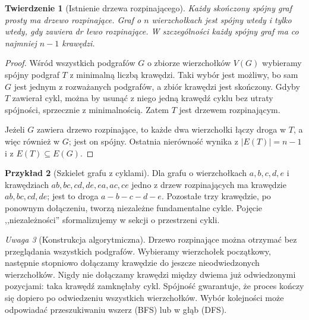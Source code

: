 \documentclass[11pt,a4paper]{report}
\numberwithin{equation}{section}
\theoremstyle{plain}
\newtheorem{twierdzenie}{Twierdzenie}[section]
\theoremstyle{definition}
\newtheorem{przyklad}[twierdzenie]{Przykład}
\theoremstyle{remark}
\newtheorem{uwaga}[twierdzenie]{Uwaga}
\begin{document}
\begin{twierdzenie}[Istnienie drzewa rozpinającego]
Każdy skończony spójny graf prosty ma drzewo
rozpinające. Graf o $n$ wierzchołkach jest
spójny wtedy i tylko wtedy, gdy zawiera
dr łewo rozpinające. W szczególności każdy
spójny graf ma co najmniej $n-1$ krawędzi.
\end{twierdzenie}

\begin{proof}
Wśród wszystkich podgrafów $G$ o zbiorze
wierzchołków $V(G)$ wybieramy spójny podgraf
$T$ z minimalną liczbą krawędzi. Taki wybór
jest możliwy, bo sam $G$ jest jednym z
rozważanych podgrafów, a zbiór krawędzi jest
skończony. Gdyby $T$ zawierał cykl, można
by usunąć z niego jedną krawędź cyklu
bez utraty spójności, sprzecznie z minimalnością.
Zatem $T$ jest drzewem rozpinającym.

Jeżeli $G$ zawiera drzewo rozpinające, to
każde dwa wierzchołki łączy droga w $T$, a więc
również w $G$; jest on spójny. Ostatnia
nierówność wynika z $|E(T)|=n-1$ i z
$E(T)\subseteq E(G)$.
\end{proof}

\begin{przyklad}[Szkielet grafu z cyklami]
Dla grafu o wierzchołkach $a,b,c,d,e$ i krawędziach
$ab,bc,cd,de,ea,ac,ce$ jedno z drzew rozpinających
ma krawędzie $ab,bc,cd,de$; jest to droga
$a-b-c-d-e$. Pozostałe trzy krawędzie, po
ponownym dołączeniu, tworzą niezależne
fundamentalne cykle. Pojęcie ,,niezależności''
sformalizujemy w sekcji o przestrzeni cykli.
\end{przyklad}

\begin{center}
\end{center}

\begin{uwaga}[Konstrukcja algorytmiczna]
Drzewo rozpinające można otrzymać bez przeglądania
wszystkich podgrafów. Wybieramy wierzchołek
początkowy, następnie stopniowo dołączamy
krawędzie do jeszcze nieodwiedzonych wierzchołków.
Nigdy nie dołączamy krawędzi między dwiema
już odwiedzonymi pozycjami: taka krawędź
zamknęłaby cykl. Spójność gwarantuje, że
proces kończy się dopiero po odwiedzeniu
wszystkich wierzchołków. Wybór kolejności
może odpowiadać przeszukiwaniu wszerz (BFS)
lub w głąb (DFS).
\end{uwaga}
\end{document}
